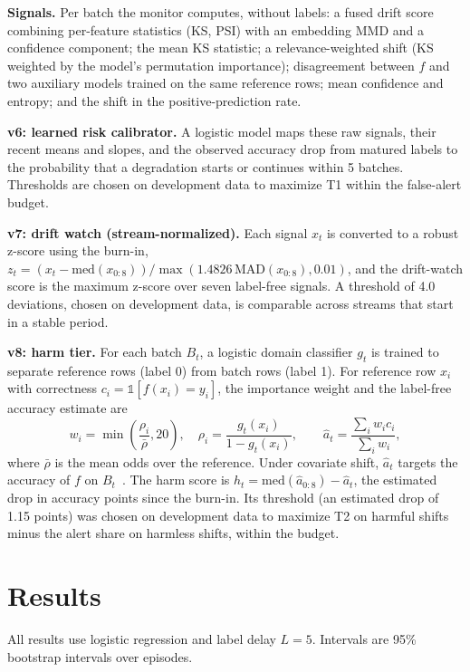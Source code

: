 \documentclass[conference]{IEEEtran}
\begin{document}
\textbf{Signals.} Per batch the monitor computes, without labels: a fused drift score combining per-feature statistics (KS, PSI) with an embedding MMD and a confidence component; the mean KS statistic; a relevance-weighted shift (KS weighted by the model's permutation importance); disagreement between $f$ and two auxiliary models trained on the same reference rows; mean confidence and entropy; and the shift in the positive-prediction rate.

\textbf{v6: learned risk calibrator.} A logistic model maps these raw signals, their recent means and slopes, and the observed accuracy drop from matured labels to the probability that a degradation starts or continues within 5 batches. Thresholds are chosen on development data to maximize T1 within the false-alert budget.

\textbf{v7: drift watch (stream-normalized).} Each signal $x_t$ is converted to a robust z-score using the burn-in, $z_t = (x_t - \mathrm{med}(x_{0:8})) / \max(1.4826\,\mathrm{MAD}(x_{0:8}), 0.01)$, and the drift-watch score is the maximum z-score over seven label-free signals. A threshold of 4.0 deviations, chosen on development data, is comparable across streams that start in a stable period.

\textbf{v8: harm tier.} For each batch $B_t$, a logistic domain classifier $g_t$ is trained to separate reference rows (label 0) from batch rows (label 1). For reference row $x_i$ with correctness $c_i = \mathbb{1}[f(x_i)=y_i]$, the importance weight and the label-free accuracy estimate are
\begin{equation}
w_i = \min\!\left(\frac{\rho_i}{\bar\rho}, 20\right),\quad \rho_i=\frac{g_t(x_i)}{1-g_t(x_i)},\qquad \hat a_t = \frac{\sum_i w_i c_i}{\sum_i w_i},
\end{equation}
where $\bar\rho$ is the mean odds over the reference. Under covariate shift, $\hat a_t$ targets the accuracy of $f$ on $B_t$~\cite{shimodaira2000,sugiyama2007iwcv}. The harm score is $h_t = \mathrm{med}(\hat a_{0:8}) - \hat a_t$, the estimated drop in accuracy points since the burn-in. Its threshold (an estimated drop of 1.15 points) was chosen on development data to maximize T2 on harmful shifts minus the alert share on harmless shifts, within the budget.

\section{Results}
All results use logistic regression and label delay $L=5$. Intervals are 95\% bootstrap intervals over episodes.
\end{document}

